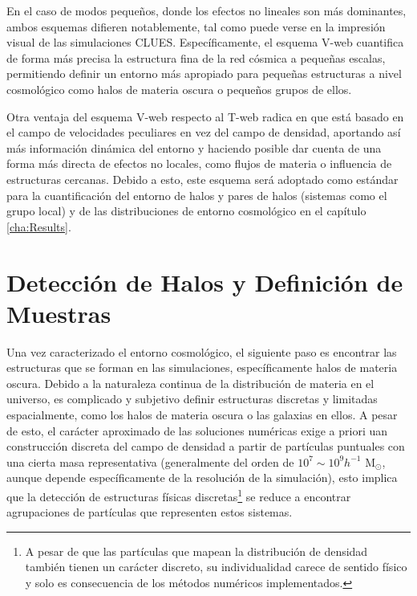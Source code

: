 En el caso de modos pequeños, donde los efectos no lineales son más 
do\-minantes, ambos esquemas difieren notablemente, tal como puede verse en 
la impresión visual de las simulaciones CLUES. Específicamente, el esquema 
V-web cuantifica de forma más precisa la estructura fina de la red 
cósmica a pequeñas escalas, permitiendo definir un entorno más apropiado 
para pequeñas estructuras a nivel cosmológico como halos de materia oscura 
o pequeños grupos de ellos.


Otra ventaja del esquema V-web respecto al T-web radica en que está basado 
en el campo de velocidades peculiares en vez del campo de densidad, aportando 
así más información dinámica del entorno y haciendo posible dar cuenta de una
forma más directa de efectos no locales, como flujos de materia o influencia 
de estructuras cercanas. Debido a esto, este esquema será adoptado como 
estándar para la cuantificación del entorno de halos y pares de halos 
(sistemas como el grupo local) y de las distribuciones de entorno 
cosmológico en el capítulo \ref{cha:Results}.






\section{Detección de Halos y Definición de Muestras}
\label{sec:HalosDetectionAndSampleDefinitions}


Una vez caracterizado el entorno cosmológico, el siguiente paso es encontrar 
las estructuras que se forman en las simulaciones, específicamente halos de 
materia oscura. Debido a la naturaleza continua de la distribución de materia 
en el universo, es complicado y subjetivo definir estructuras discretas y 
limitadas espacialmente, como los halos de materia oscura o las galaxias en 
ellos. A pesar de esto, el carácter aproximado de las soluciones numéricas 
exige a priori uan construcción discreta del campo de densidad a partir de 
partículas puntuales con una cierta masa representativa (generalmente del 
orden de $10^7 \sim 10^9 h^{-1}$ M$_{\odot}$, aunque depende específicamente 
de la resolución de la simulación), esto implica que la detección de 
estructuras físicas discretas\footnote{A pesar de que las partículas que 
mapean la distribución de densidad también tienen un carácter discreto, su 
individualidad carece de sentido físico y solo es consecuencia de los 
métodos numéricos implementados.} se reduce a encontrar agrupaciones de 
partículas que representen estos sistemas.


